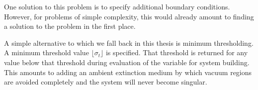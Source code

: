 One solution to this problem is to specify additional boundary conditions. However, for problems of simple complexity, this would already amount to finding a solution to the problem in the first place.

A simple alternative to which we fall back in this thesis is minimum thresholding. A minimum threshold value $\lfloor\sigma_t\rfloor$ is specified. That threshold is returned for any value below that threshold during evaluation of the variable for system building. This amounts to adding an ambient extinction medium by which vacuum regions are avoided completely and the system will never become singular.




